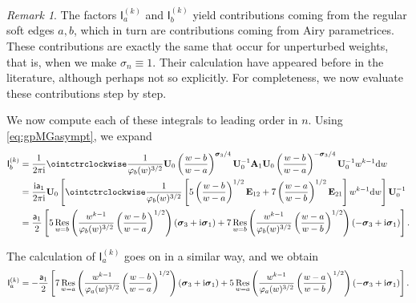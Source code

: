 \documentclass[reqno,a4paper,11pt]{amsart}
\newcommand{\res}{\mathop{\rm Res}}
\newcommand{\ii}{\mathrm{i}}
\newcommand{\dd}{\mathrm{d}}
\renewcommand{\bm}{\mathbf}
\newcommand{\msf}{\mathsf}
\renewcommand{\sp}{\boldsymbol \sigma}
\theoremstyle{definition}
\theoremstyle{remark}
\newtheorem{remark}[theorem]{Remark}
\numberwithin{equation}{section}
\begin{document}
\begin{remark}
    The factors $\msf I_a^{(k)}$ and $\msf I_b^{(k)}$ yield contributions coming from the regular soft edges $a,b$, which in turn are contributions coming from Airy parametrices. These contributions are exactly the same that occur for unperturbed weights, that is, when we make $\sigma_n\equiv 1$. Their calculation have appeared before in the literature, although perhaps not so explicitly. For completeness, we now evaluate these contributions step by step.
\end{remark}

We now compute each of these integrals to leading order in $n$. Using \eqref{eq:gpMGasympt}, we expand
%
    \begin{align}
        \msf I_b^{(k)}
        &=\frac{1}{2\pi\ii}\ointctrclockwise \frac{1}{\varphi_b(w)^{3/2}}\bm U_0\left(\frac{w-b}{w-a}\right)^{\sp_3/4}\bm U_0^{-1}\bm A_1\bm U_0\left(\frac{w-b}{w-a}\right)^{-\sp_3/4}\bm U_0^{-1}w^{k-1}\dd w \nonumber \\
        &=\frac{\ii \msf a_1}{2\pi\ii}\bm U_0\left[\ointctrclockwise \frac{1}{\varphi_b(w)^{3/2}}\left[5\left(\frac{w-b}{w-a}\right)^{1/2}\bm E_{12}+7\left(\frac{w-a}{w-b}\right)^{1/2}\bm E_{21}\right]w^{k-1}\dd w\right]\bm U_0^{-1}\nonumber \\
        &=   \frac{\msf a_1}{2}
        \left[5\res_{w=b}\left(\frac{w^{k-1}}{\varphi_b(w)^{3/2}}\left(\frac{w-b}{w-a}\right)^{1/2}\right) \left( \sp_3 + \ii \sp_1 \right)
        + 7 \res_{w=b}\left(\frac{w^{k-1}}{\varphi_b(w)^{3/2}}\left(\frac{w-a}{w-b}\right)^{1/2}\right) \left( - \sp_3 + \ii \sp_1 \right)\right]. \label{eq:Ikbresidue} 
    \end{align}
   
    
    
    The calculation of $\msf I_a^{(k)}$ goes on in a similar way, and we obtain
    \begin{equation}\label{eq:Ikaresidue}
        \msf I_a^{(k)}
            =-\frac{\msf a_1}{2}\left[ 7 \res_{w=a}\left(\frac{w^{k-1}}{\varphi_a(w)^{3/2}}\left(\frac{w-b}{w-a}\right)^{1/2}\right) \left( \sp_3 + \ii \sp_1\right)
            + 5 \res_{w=a}\left(\frac{w^{k-1}}{\varphi_a(w)^{3/2}}\left(\frac{w-a}{w-b}\right)^{1/2}\right)\left( - \sp_3 + \ii \sp_1\right)\right].
    \end{equation}
   
\end{document}
